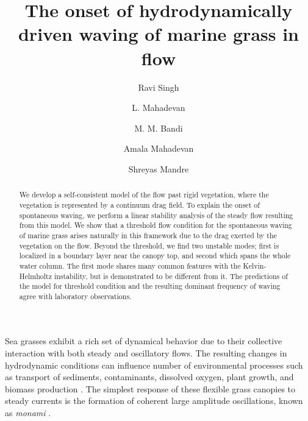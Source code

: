 \documentclass[aps,prl,twocolumn,superscriptaddress,10pt]{revtex4-1}  %
\newcommand{\monami}{\textit{monami }}
\begin{document}
\title{The onset of hydrodynamically driven waving of marine grass in flow}
\author{Ravi Singh}
\author{L. Mahadevan}
\author{M. M. Bandi}
\author{Amala Mahadevan}
\author{Shreyas Mandre}

\begin{abstract}
We develop a self-consistent model of the flow past rigid vegetation, where the vegetation is represented by a continuum drag field. To explain the onset of spontaneous waving, we perform a linear stability analysis of the steady flow resulting from this model. We show that a threshold flow condition for the spontaneous waving of marine grass arises naturally in this framework due to the drag exerted by the vegetation on the flow. Beyond the threshold, we find two unstable modes; first is localized in a boundary layer near the canopy top, and second which spans the whole water column. The first mode shares many common features with the Kelvin-Helmholtz instability, but is demonstrated to be different from it. The predictions of the model for threshold condition and the resulting dominant frequency of waving agree with laboratory observations. 
\end{abstract}
\maketitle
Sea grasses exhibit a rich set of dynamical behavior due to their collective interaction with both steady and oscillatory flows.  
The resulting changes in hydrodynamic conditions can influence number of environmental processes such as transport of sediments, contaminants, dissolved oxygen, plant growth, and biomass production  \cite{Fonseca87,Grizzle96,Nepf99,Nepf2012}. 
The simplest response of these flexible grass canopies to steady currents is the formation of coherent large amplitude oscillations, known as \monami \cite{AckermanOkubo93}.  
\end{document}
